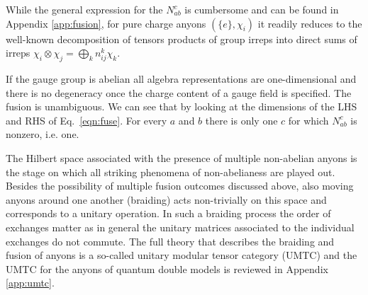 \documentclass[two column]{article}
\begin{document}
While the general expression for the $N_{ab}^c$ is cumbersome and can be found in Appendix \ref{app:fusion}, for pure charge anyons $(\{e\}, \chi_i)$ it readily reduces to the well-known  decomposition of tensors products of group irreps into direct sums of irreps $\chi_i\otimes\chi_j = \bigoplus_k n^k_{ij} \chi_k$.

If the gauge group is abelian all algebra representations are one-dimensional and there is no degeneracy once the charge content of a gauge field is specified. The fusion is unambiguous. 
We can see that by looking at the dimensions of the LHS and RHS of Eq.~\eqref{eqn:fuse}. For every $a$ and $b$ there is only one $c$ for which $N_{ab}^c$ is nonzero, i.e. one.

The Hilbert space associated with the presence of multiple non-abelian anyons is the stage on which all striking phenomena of non-abelianess are played out. Besides the possibility of multiple fusion outcomes discussed above,  also moving anyons around one another (braiding) acts non-trivially on this space and corresponds to a unitary operation. In such a braiding process the order of exchanges matter as in general the unitary matrices associated to the individual exchanges do not commute. The full theory that describes the braiding and fusion of anyons is a so-called unitary modular tensor category (UMTC)\cite{Kitaev_2003} and the UMTC for the anyons of quantum double models is reviewed in Appendix \ref{app:umtc}.
\end{document}
